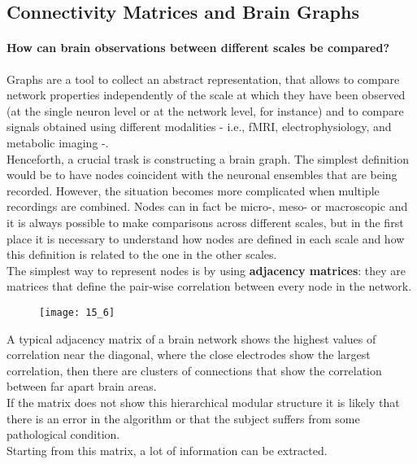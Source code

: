 \subsection{Connectivity Matrices and Brain Graphs}
\paragraph{How can brain observations between different scales be compared?} Graphs are a tool to collect an
abstract representation, that allows to compare network properties independently of the scale at which they
have been observed (at the single neuron level or at the network level, for instance) and to compare
signals obtained using different modalities - i.e., fMRI, electrophysiology, and metabolic imaging -.\\
Henceforth, a crucial trask is constructing a brain graph. The simplest definition would be to have nodes
coincident with the neuronal ensembles that are being recorded. However, the situation becomes more
complicated when multiple recordings are combined. Nodes can in fact be micro-, meso- or macroscopic and
it is always possible to make comparisons across different scales, but in the first place it is necessary
to understand how nodes are defined in each scale and how this definition is related to the one in the other scales.\\
The simplest way to represent nodes is by using \textbf{adjacency matrices}: they are matrices that define the pair-wise
correlation between every node in the network.
\begin{figure}[H]
    \centering
    \texttt{[image: 15\_6]}
\end{figure}
A typical adjacency matrix of a brain network shows the highest values of correlation near the diagonal,
where the close electrodes show the largest correlation, then there are clusters of connections that show
the correlation between far apart brain areas.\\
If the matrix does not show this hierarchical modular structure it is likely that there is an error in the algorithm
or that the subject suffers from some pathological condition.\\
Starting from this matrix, a lot of information can be extracted.
